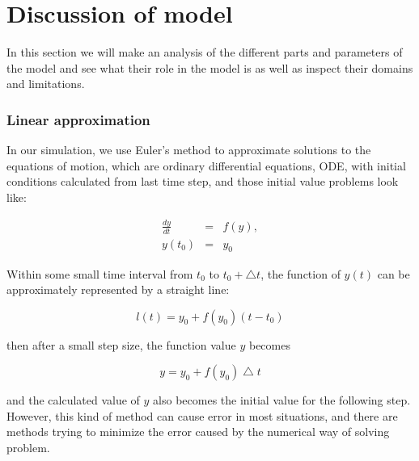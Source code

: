 \section{Discussion of model}
\label{sec:discussion}
In this section we will make an analysis of the different parts and 
parameters of the model and see what their role in the model is as well 
as inspect their domains and limitations. 


\subsubsection{Linear approximation}
In our simulation, we use Euler's method to approximate solutions to the equations of motion, 
which are ordinary differential equations, ODE, with initial conditions calculated from last time step, 
and those initial value problems look like:

\begin{eqnarray}
\frac{dy}{dt} &=& f(y),\\
y(t_{0}) &=& y_{0}
\end{eqnarray}

Within some small time interval from $t_{0}$ to $t_{0}+\bigtriangleup t$, the function of $ y(t) $ 
can be approximately represented by a straight line:

\begin{equation}
l(t) = y_{0} + f(y_{0}) (t-t_{0})
\end{equation}

then after a small step size, the function value $ y $ becomes

\begin{equation}
y = y_{0} + f(y_{0}) \bigtriangleup t
\end{equation}

and the calculated value of $ y $ also becomes the initial value for the following step. 
However, this kind of method can cause error in most situations, and there are methods trying 
to minimize the error caused by the numerical way of solving problem.\\

